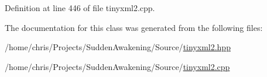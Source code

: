 Definition at line 446 of file tinyxml2.\-cpp.



The documentation for this class was generated from the following files\-:\begin{DoxyCompactItemize}
\item 
/home/chris/\-Projects/\-Sudden\-Awakening/\-Source/\hyperlink{tinyxml2_8hpp}{tinyxml2.\-hpp}\item 
/home/chris/\-Projects/\-Sudden\-Awakening/\-Source/\hyperlink{tinyxml2_8cpp}{tinyxml2.\-cpp}\end{DoxyCompactItemize}
